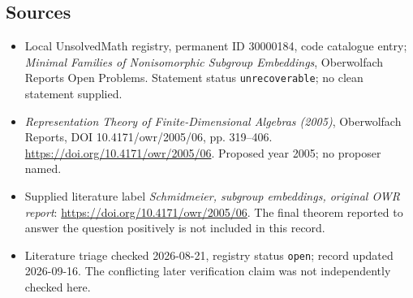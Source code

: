 \documentclass[11pt]{article}
\begin{document}
\subsection{Sources}
\begin{itemize}\item Local UnsolvedMath registry, permanent ID 30000184, code catalogue entry; \emph{Minimal Families of Nonisomorphic Subgroup Embeddings}, Oberwolfach Reports Open Problems. Statement status \texttt{unrecoverable}; no clean statement supplied.\item \emph{Representation Theory of Finite-Dimensional Algebras (2005)}, Oberwolfach Reports, DOI 10.4171/owr/2005/06, pp. 319--406. \url{https://doi.org/10.4171/owr/2005/06}. Proposed year 2005; no proposer named.\item Supplied literature label \emph{Schmidmeier, subgroup embeddings, original OWR report}: \url{https://doi.org/10.4171/owr/2005/06}. The final theorem reported to answer the question positively is not included in this record.\item Literature triage checked 2026-08-21, registry status \texttt{open}; record updated 2026-09-16. The conflicting later verification claim was not independently checked here.\end{itemize}
\end{document}
